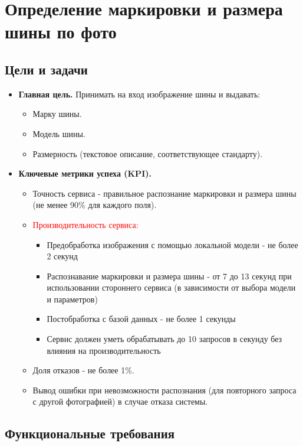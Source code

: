 \documentclass[12pt]{article}
\begin{document}
\section{Определение маркировки и размера шины по фото}
\label{sec:tire_classification}
\subsection{Цели и задачи}
\begin{itemize}
	\item \textbf{Главная цель.} Принимать на вход изображение шины и выдавать:
	      \begin{itemize}
		      \item Марку шины.
		      \item Модель шины.
		      \item Размерность (текстовое описание, соответствующее стандарту).
	      \end{itemize}
	\item \textbf{Ключевые метрики успеха (KPI).}
	      \begin{itemize}
		      \item Точность сервиса - правильное распознание маркировки и размера шины (не менее 90\% для каждого поля).
		      \item \textcolor{red}{Производительность сервиса:}
			  \begin{itemize}
				\item Предобработка изображения с помощью локальной модели - не более 2 секунд
				\item Распознавание маркировки и размера шины - от 7 до 13 секунд при использовании стороннего сервиса (в зависимости от выбора модели и параметров)
				\item Постобработка с базой данных - не более 1 секунды
				\item Сервис должен уметь обрабатывать до 10 запросов в секунду без влияния на производительность
			  \end{itemize}
		      \item Доля отказов - не более 1\%.
		      \item Вывод ошибки при невозможности распознания (для повторного запроса с другой фотографией) в случае отказа системы.
	      \end{itemize}
\end{itemize}

\subsection{Функциональные требования}
\end{document}
